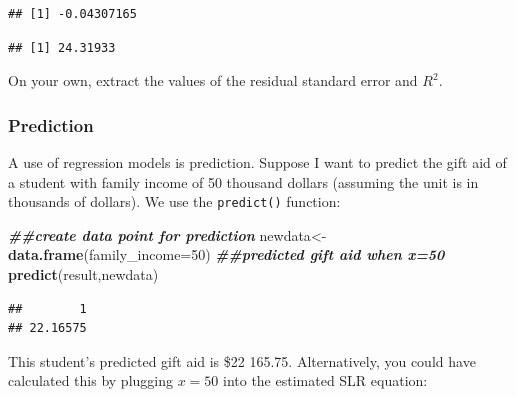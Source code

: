 \documentclass[
]{book}
\newenvironment{Shaded}{\begin{snugshade}}{\end{snugshade}}
\newcommand{\AttributeTok}[1]{\textcolor[rgb]{0.13,0.29,0.53}{#1}}
\newcommand{\DecValTok}[1]{\textcolor[rgb]{0.00,0.00,0.81}{#1}}
\newcommand{\DocumentationTok}[1]{\textcolor[rgb]{0.56,0.35,0.01}{\textbf{\textit{#1}}}}
\newcommand{\FunctionTok}[1]{\textcolor[rgb]{0.13,0.29,0.53}{\textbf{#1}}}
\newcommand{\NormalTok}[1]{#1}
\newcommand{\OtherTok}[1]{\textcolor[rgb]{0.56,0.35,0.01}{#1}}
\newcommand{\SpecialCharTok}[1]{\textcolor[rgb]{0.81,0.36,0.00}{\textbf{#1}}}
\begin{document}
\begin{verbatim}
## [1] -0.04307165
\end{verbatim}

\begin{Shaded}
\end{Shaded}

\begin{verbatim}
## [1] 24.31933
\end{verbatim}

On your own, extract the values of the residual standard error and \(R^2\).

\subsubsection*{Prediction}\label{prediction}

A use of regression models is prediction. Suppose I want to predict the gift aid of a student with family income of 50 thousand dollars (assuming the unit is in thousands of dollars). We use the \texttt{predict()} function:

\begin{Shaded}
\begin{Highlighting}[]
\DocumentationTok{\#\#create data point for prediction}
\NormalTok{newdata}\OtherTok{\textless{}{-}}\FunctionTok{data.frame}\NormalTok{(}\AttributeTok{family\_income=}\DecValTok{50}\NormalTok{)}
\DocumentationTok{\#\#predicted gift aid when x=50}
\FunctionTok{predict}\NormalTok{(result,newdata)}
\end{Highlighting}
\end{Shaded}

\begin{verbatim}
##        1 
## 22.16575
\end{verbatim}

This student's predicted gift aid is \$22 165.75. Alternatively, you could have calculated this by plugging \(x=50\) into the estimated SLR equation:

\begin{Shaded}
\end{Shaded}
\end{document}
